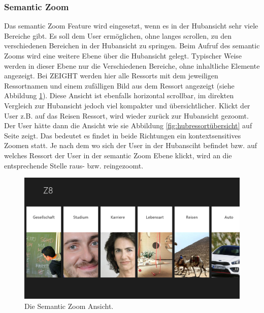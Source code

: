 \documentclass[12pt,a4paper,bibtotoc,abstracton]{scrartcl}
\begin{document}
\subsubsection{Semantic Zoom}
\label{subsubsec:semanticzoom}
Das semantic Zoom Feature wird eingesetzt, wenn es in der Hubansicht sehr viele Bereiche gibt. Es soll dem User ermöglichen, ohne langes scrollen, zu den verschiedenen Bereichen in der Hubansicht zu springen. Beim Aufruf des semantic Zooms wird eine weitere Ebene über die Hubansicht gelegt. Typischer Weise werden in dieser Ebene nur die Verschiedenen Bereiche, ohne inhaltliche Elemente angezeigt. Bei ZEIGHT werden hier alle Ressorts mit dem jeweiligen Ressortnamen und einem zufälligen Bild aus dem Ressort angezeigt (siehe Abbildung \ref{fig:semanticzoom}). Diese Ansicht ist ebenfalls horizontal scrollbar, im direkten Vergleich zur Hubansicht jedoch viel kompakter und übersichtlicher. Klickt der User z.B. auf das Reisen Ressort, wird wieder zurück zur Hubansicht \glqq gezoomt\grqq. Der User hätte dann die Ansicht wie sie Abbildung \ref{fig:hubressortübersicht} auf Seite \pageref{fig:hubressortübersicht} zeigt. Das bedeutet es findet in beide Richtungen ein kontextsensitives Zoomen statt. Je nach dem wo sich der User in der Hubansciht befindet bzw. auf welches Ressort der User in der semantic Zoom Ebene klickt, wird an die entsprechende Stelle raus- bzw. reingezoomt.  

\begin{figure}[h]
	\centering
	\includegraphics[width=\textwidth]{Bilder/Screenshots/app/reise_aegypten_1zoom.png} 
	\caption{Die Semantic Zoom Ansicht.}
	\label{fig:semanticzoom}
\end{figure}  
\end{document}
